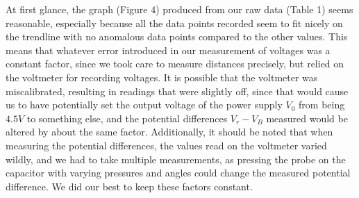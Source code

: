 \documentclass[letterpaper]{article}
\begin{document}
At first glance, the graph (Figure 4) produced from our raw data (Table 1) seems reasonable, especially
because all the data points recorded seem to fit nicely on the trendline with
no anomalous data points compared to the other values. This means that whatever error
introduced in our measurement of voltages was a constant factor, since we took care
to measure distances precisely, but relied on the voltmeter for recording voltages.
It is possible that the voltmeter was miscalibrated, resulting in readings that were slightly off,
since that would cause us to have potentially set the output voltage of the power supply $V_0$ from being $4.5 V$ to something else,
and the potential differences $V_r-V_B$ measured would be altered by about the same factor. Additionally,
it should be noted that when measuring the potential differences, the values read on the voltmeter varied
wildly, and we had to take multiple measurements, as pressing the probe on the capacitor with varying pressures and
angles could change the measured potential difference. We did our best to keep these factors constant.
\end{document}
